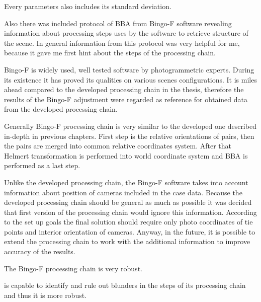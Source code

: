 \documentclass[a4paper,12pt]{article}
\begin{document}
Every parameters also includes its standard deviation. 


Also there was included protocol of BBA from Bingo-F software \cite{bingo2013gip} revealing 
information about processing steps uses by the software to retrieve structure of the scene.
In general information from this protocol was very helpful for me, because 
it gave me first hint about the steps of the processing chain.

Bingo-F is widely used, well tested software by photogrammetric experts. During its existence it has proved its qualities on various scenes configurations.  
It is miles ahead compared to the developed processing chain in the thesis, therefore the results of the Bingo-F adjustment were 
regarded as reference for obtained data from the developed processing chain.

Generally Bingo-F processing chain is very similar to the developed  one  
described in-depth in previous chapters. First step is the relative orientations of pairs, then the pairs are merged into common relative 
coordinates system. After that Helmert transformation is performed into world coordinate system and BBA is performed as a last step.

Unlike the developed processing chain, the Bingo-F software takes into account information about position of cameras included in the case data. 
Because the developed processing chain should be general as much as possible it was decided that first version of the processing chain would ignore this 
information. According to the set up goals the final solution should require only photo coordinates of tie points and interior 
orientation of cameras. Anyway, in the future, it is possible to extend the processing chain to work with the additional information to improve accuracy 
of the results. 

The Bingo-F processing chain is very robust. 

is capable to identify and rule out blunders in the steps of its processing chain and thus it is more robust.
\end{document}
